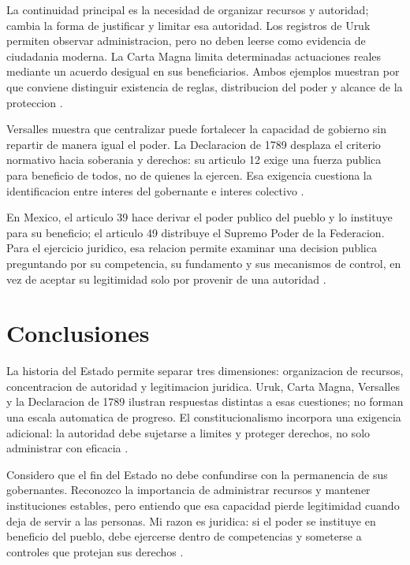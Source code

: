 \documentclass[spanish,letterpaper,oneside]{article}
\begin{document}
La continuidad principal es la necesidad de organizar recursos y
autoridad; cambia la forma de justificar y limitar esa autoridad.
Los registros de Uruk permiten observar administracion, pero no deben
leerse como evidencia de ciudadania moderna. La Carta Magna limita
determinadas actuaciones reales mediante un acuerdo desigual en sus
beneficiarios. Ambos ejemplos muestran por que conviene distinguir
existencia de reglas, distribucion del poder y alcance de la proteccion
\citep{metUruk2003,parliamentMagnaCarta}.

Versalles muestra que centralizar puede fortalecer la capacidad de
gobierno sin repartir de manera igual el poder. La Declaracion de 1789
desplaza el criterio normativo hacia soberania y derechos: su articulo
12 exige una fuerza publica para beneficio de todos, no de quienes la
ejercen. Esa exigencia cuestiona la identificacion entre interes del
gobernante e interes colectivo \citep{versaillesLouisXIV,francia1789}.

En Mexico, el articulo 39 hace derivar el poder publico del pueblo y
lo instituye para su beneficio; el articulo 49 distribuye el Supremo
Poder de la Federacion. Para el ejercicio juridico, esa relacion permite
examinar una decision publica preguntando por su competencia, su
fundamento y sus mecanismos de control, en vez de aceptar su legitimidad
solo por provenir de una autoridad \citep{cpeum2026S2,garciaRicci2011}.

\clearpage
\section{Conclusiones}

La historia del Estado permite separar tres dimensiones: organizacion
de recursos, concentracion de autoridad y legitimacion juridica.
Uruk, Carta Magna, Versalles y la Declaracion de 1789 ilustran respuestas
distintas a esas cuestiones; no forman una escala automatica de progreso.
El constitucionalismo incorpora una exigencia adicional: la autoridad
debe sujetarse a limites y proteger derechos, no solo administrar con
eficacia \citep{garciaRicci2011,francia1789}.

Considero que el fin del Estado no debe confundirse con la permanencia
de sus gobernantes. Reconozco la importancia de administrar recursos y
mantener instituciones estables, pero entiendo que esa capacidad pierde
legitimidad cuando deja de servir a las personas. Mi razon es juridica:
si el poder se instituye en beneficio del pueblo, debe ejercerse dentro
de competencias y someterse a controles que protejan sus derechos
\citep[arts.~1, 39 y 49]{cpeum2026S2}.
\end{document}
